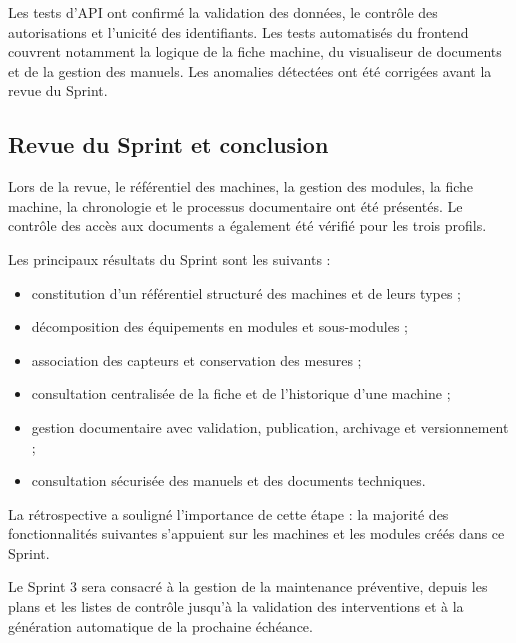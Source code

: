 Les tests d'API ont confirmé la validation des données, le contrôle des autorisations et l'unicité des identifiants. Les tests automatisés du frontend couvrent notamment la logique de la fiche machine, du visualiseur de documents et de la gestion des manuels. Les anomalies détectées ont été corrigées avant la revue du Sprint.

\subsection{Revue du Sprint et conclusion}

Lors de la revue, le référentiel des machines, la gestion des modules, la fiche machine, la chronologie et le processus documentaire ont été présentés. Le contrôle des accès aux documents a également été vérifié pour les trois profils.

Les principaux résultats du Sprint sont les suivants :

\begin{itemize}
    \item constitution d'un référentiel structuré des machines et de leurs types ;
    \item décomposition des équipements en modules et sous-modules ;
    \item association des capteurs et conservation des mesures ;
    \item consultation centralisée de la fiche et de l'historique d'une machine ;
    \item gestion documentaire avec validation, publication, archivage et versionnement ;
    \item consultation sécurisée des manuels et des documents techniques.
\end{itemize}

La rétrospective a souligné l'importance de cette étape : la majorité des fonctionnalités suivantes s'appuient sur les machines et les modules créés dans ce Sprint.

Le Sprint 3 sera consacré à la gestion de la maintenance préventive, depuis les plans et les listes de contrôle jusqu'à la validation des interventions et à la génération automatique de la prochaine échéance.
